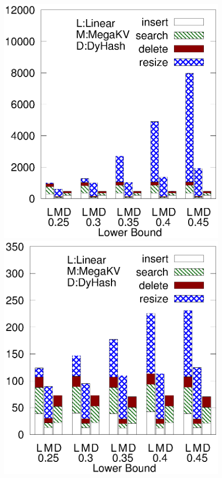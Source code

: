 \begin{figure}[htp]
\begin{minipage}{0.19\linewidth}
		\centerline{\dsreddit}
	\end{minipage}
	\begin{minipage}{0.19\linewidth}\centering
		\includegraphics[width=\linewidth]{pic/dynamic/tpch/diff_lower.eps}
		\centerline{\dstpch}
	\end{minipage}
	\begin{minipage}{0.19\linewidth}\centering
		\includegraphics[width=\linewidth]{pic/dynamic/ali/diff_lower.eps}

\end{minipage}
\end{figure}
